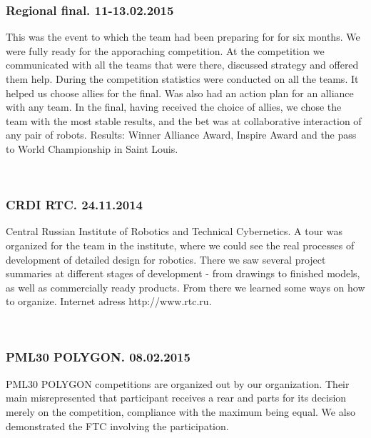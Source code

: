 	\subsubsection{Regional final. 11-13.02.2015}	
	This was the event to which the team had been preparing for for six months. We were fully ready for the apporaching competition. At the competition we communicated with all the teams that were there, discussed strategy and offered them help. During the competition statistics were conducted on all the teams. It helped us choose allies for the final. Was also had an action plan for an alliance with any team. In the final, having received the choice of allies, we chose the team with the most stable results, and the bet was at collaborative interaction of any pair of robots. Results: Winner Alliance Award, Inspire Award and the pass to World Championship in Saint Louis.
	\begin{figure}[H]
		\\
	\end{figure}
	\newpage			
	\subsubsection{CRDI RTC. 24.11.2014}
	Central Russian Institute of Robotics and Technical Cybernetics. A tour was organized for the team in the institute, where we could see the real processes of development of detailed design for robotics. There we saw several project summaries at different stages of development - from drawings to finished models, as well as commercially ready products. From there we learned some ways on how to organize. Internet adress http://www.rtc.ru.
	\begin{figure}[H]	
		\\
	\end{figure}
	\subsubsection{PML30 POLYGON. 08.02.2015}	
	PML30 POLYGON competitions are organized out by our organization. Their main misrepresented that participant receives a rear and parts for its decision merely on the competition, compliance with the maximum being equal. We also demonstrated the FTC involving the participation.
	\begin{figure}[H]
		\\
    \end{figure}
